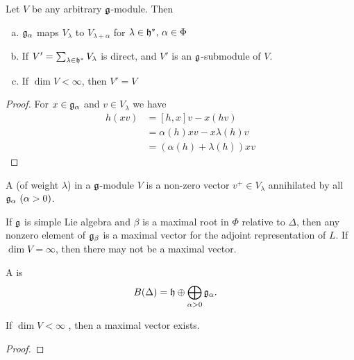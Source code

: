 \begin{lemma}
    Let $V$ be any arbitrary $\mathfrak{g}$-module. Then
    \begin{enumerate}[(a)]
        \makethislistcompact
        \item 
            $\mathfrak{g}_\alpha$ maps $V_\lambda$ to $V_{\lambda+\alpha}$ for $\lambda\in \mathfrak{h}^*,\,\alpha\in\Phi$
        \item 
            If $V'=\sum_{\lambda\in \mathfrak{h}^*} V_\lambda$ is direct, and $V'$ is an $\mathfrak{g}$-submodule of $V$.
        \item
            If $\dim V < \infty$, then $V'=V$
    \end{enumerate}
\end{lemma}
\begin{proof}
    For $x\in \mathfrak{g}_\alpha$ and $v\in V_\lambda$  we have
    \begin{align*}
        h(xv) &= [h,x]v - x(hv)\\
            &= \alpha(h)xv - x\lambda(h)v \\
            &= (\alpha(h) + \lambda(h)) xv
    \end{align*}
\end{proof}

A  (of weight $\lambda$) in a $\mathfrak{g}$-module $V$ is a non-zero vector $v^+\in V_\lambda$ annihilated by all $\mathfrak{g}_\alpha\ (\alpha > 0)$. 

\begin{insight}
    If $\mathfrak{g}$ is simple Lie algebra and $\beta$ is a maximal root in $\Phi$ relative to $\Delta$, then any nonzero element of $\mathfrak{g}_\beta$ is a maximal vector for the adjoint representation of $L$.
    If $\dim V = \infty$, then there may not be a maximal vector.
\end{insight}


A  is
\begin{align}
    B(\Delta) &= \mathfrak{h}\oplus \bigoplus_{\alpha>0} \mathfrak{g}_\alpha.
\end{align}
\begin{lemma}
    If $\dim V < \infty$ , then a maximal vector exists.
\end{lemma}
\begin{proof}
\end{proof}



